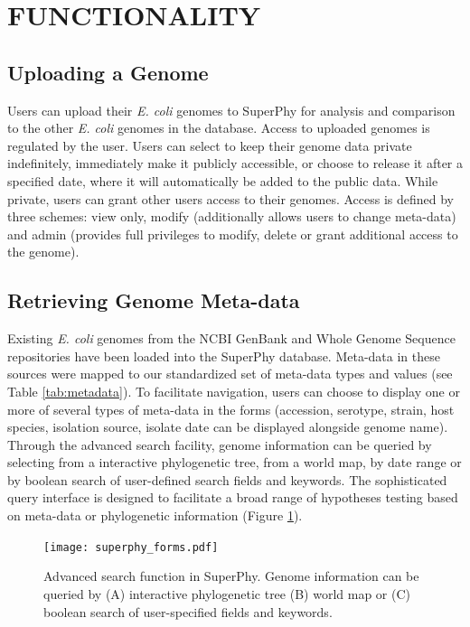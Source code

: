 \documentclass[a4paper,twoside]{article}
\begin{document}
\section{\uppercase{Functionality}}
\label{sec:functionality}

\subsection{Uploading a Genome}

Users can upload their \textit{E. coli} genomes to SuperPhy for analysis and comparison to the other \textit{E. coli} genomes in the database.  Access to uploaded genomes is regulated by the user. Users can select to keep their genome data private indefinitely, immediately make it publicly accessible, or choose to release it after a specified date, where it will automatically be added to the public data.  While private, users can grant other users access to their genomes.  Access is defined by three schemes: view only, modify (additionally allows users to change meta-data) and admin (provides full privileges to modify, delete or grant additional access to the genome).

\subsection{Retrieving Genome Meta-data}

Existing \textit{E. coli} genomes from the NCBI GenBank and Whole Genome Sequence repositories \cite{benson2013genbank} have been loaded into the SuperPhy database. Meta-data in these sources were mapped to our standardized set of meta-data types and values (see Table \ref{tab:metadata}). To facilitate navigation,
users can choose to display one or more of several types of meta-data in the forms (accession, serotype, strain, host species, isolation source, isolate date can be displayed alongside genome name). Through the advanced search facility, genome information can be queried by selecting from a interactive phylogenetic tree, from a world map, by date range or by boolean search of user-defined search fields and keywords.  The sophisticated query interface is designed to facilitate a broad range of hypotheses testing based on meta-data or phylogenetic information (Figure \ref{fig:search}).

\begin{figure}[t]
  \vspace{-0.2cm}
  \centering
   {\texttt{[image: superphy\_forms.pdf]}}
  \caption{Advanced search function in SuperPhy. Genome information can be queried by (A) interactive phylogenetic tree (B) world map or (C) boolean search of user-specified fields and keywords.}
  \label{fig:search}
\end{figure}
\end{document}
